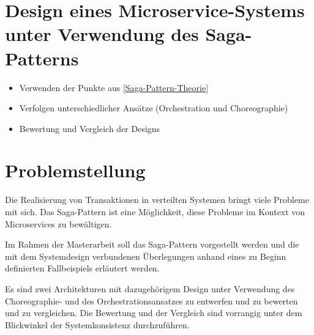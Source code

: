 \section{Design eines Microservice-Systems unter Verwendung des Saga-Patterns}
\begin{itemize}
	\item Verwenden der Punkte aus \ref{Saga-Pattern-Theorie}
	\item Verfolgen unterschiedlicher Ansätze (Orchestration und Choreographie)
	\item Bewertung und Vergleich der Designs
\end{itemize}

\section{Problemstellung}
\par Die Realisierung von Transaktionen in verteilten Systemen bringt viele Probleme mit sich. Das Saga-Pattern ist eine Möglichkeit, diese Probleme im Kontext von Microservices zu bewältigen. 

\par Im Rahmen der Masterarbeit soll das Saga-Pattern vorgestellt werden und die mit dem Systemdesign verbundenen Überlegungen anhand eines zu Beginn definierten Fallbeispiels erläutert werden. 

\par Es sind zwei Architekturen mit dazugehörigem Design unter Verwendung des Choreographie- und des Orchestrationsansatzes zu entwerfen und zu bewerten und zu vergleichen. Die Bewertung und der Vergleich sind vorrangig unter dem Blickwinkel der Systemkonsistenz durchzuführen. 